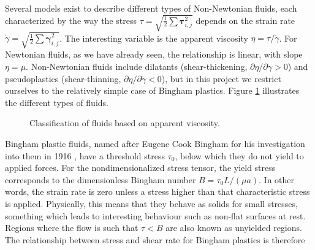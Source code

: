 \documentclass[final,3p,twocolumn]{elsarticle}
\begin{document}
Several models exist to describe different types of Non-Newtonian fluids, each
characterized by the way the stress $\tau = \sqrt{\frac{1}{2} \sum
\bm{\tau}_{i,j}^2}$ depends on the strain rate $\dot{\gamma} =
\sqrt{\frac{1}{2} \sum \dot{\bm{\gamma}}_{i,j}^2}$. The interesting variable is
the apparent viscosity $\eta = \tau/ \dot{\gamma}$. For Newtonian fluids, as we
have already seen, the relationship is linear, with slope $\eta = \mu$.
Non-Newtonian fluids include dilatants (shear-thickening, $\partial
\eta/\partial \dot{\gamma} > 0$) and pseudoplastics (shear-thinning, $\partial
\eta/\partial \dot{\gamma} < 0$), but in this project we restrict ourselves to
the relatively simple case of Bingham plastics. Figure \ref{fig:fluids}
illustrates the different types of fluids. 

\begin{figure}[htb]
    \centering
    \caption{Classification of fluids based on apparent viscosity.}
    \label{fig:fluids}
\end{figure}

Bingham plastic fluids, named after Eugene Cook Bingham for his investigation
into them in 1916 \cite{bingham1916investigation}, have a threshold stress
$\tau_0$, below which they do not yield to applied forces. For the
nondimensionalized stress tensor, the yield stress corresponds to the
dimensionless Bingham number $B = \tau_0 L/(\mu a)$. In other words, the strain
rate is zero unless a stress higher than that characteristic stress is applied.
Physically, this means that they behave as solids for small stresses, something
which leads to interesting behaviour such as non-flat surfaces at rest. Regions
where the flow is such that $\tau < B$ are also known as unyielded
regions. The relationship between stress and shear rate for Bingham plastics is
therefore
\end{document}
